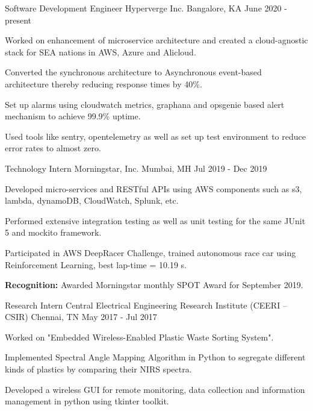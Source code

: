 \begin{cventries}
  \cventry
  {Software Development Engineer}
  {Hyperverge Inc.}
  {Bangalore, KA}
  {June 2020 - present}
  {
    \begin{cvitems}
      \item {Worked on enhancement of microservice architecture and created a cloud-agnostic stack for SEA nations in AWS, Azure and Alicloud.}
      \item {Converted the synchronous architecture to Asynchronous event-based architecture thereby reducing response times by 40\%.}    
      \item {Set up alarms using cloudwatch metrics, graphana and opsgenie based alert mechanism to achieve 99.9\% uptime.}
      \item {Used tools like sentry, opentelemetry as well as set up test environment to reduce error rates to almost zero.}
    \end{cvitems}
  }
  \cventry
    {Technology Intern}
    {Morningstar, Inc.}
    {Mumbai, MH}
    {Jul 2019 - Dec 2019}
    {
      \begin{cvitems}
        \item {Developed micro-services and RESTful APIs using AWS components such as s3, lambda, dynamoDB, CloudWatch, Splunk, etc.}
        \item {Performed extensive integration testing as well as unit testing for the same JUnit 5 and mockito framework.}
        \item {Participated in AWS DeepRacer Challenge, trained autonomous race car using Reinforcement Learning, best lap-time = 10.19 s.}
        \item {\textbf{Recognition:} Awarded Morningstar monthly SPOT Award for September 2019.}
      \end{cvitems}
    }
  \cventry
    {Research Intern}
    {Central Electrical Engineering Research Institute (CEERI – CSIR)}
    {Chennai, TN}
    {May 2017 - Jul 2017}
    {
      \begin{cvitems}
        \item {Worked on "Embedded Wireless-Enabled Plastic Waste Sorting System".}
        \item {Implemented Spectral Angle Mapping Algorithm in Python to segregate different kinds of plastics by comparing their NIRS spectra.}
        \item {Developed a wireless GUI for remote monitoring, data collection and information management in python using tkinter toolkit.}
      \end{cvitems}
    }

\end{cventries}

